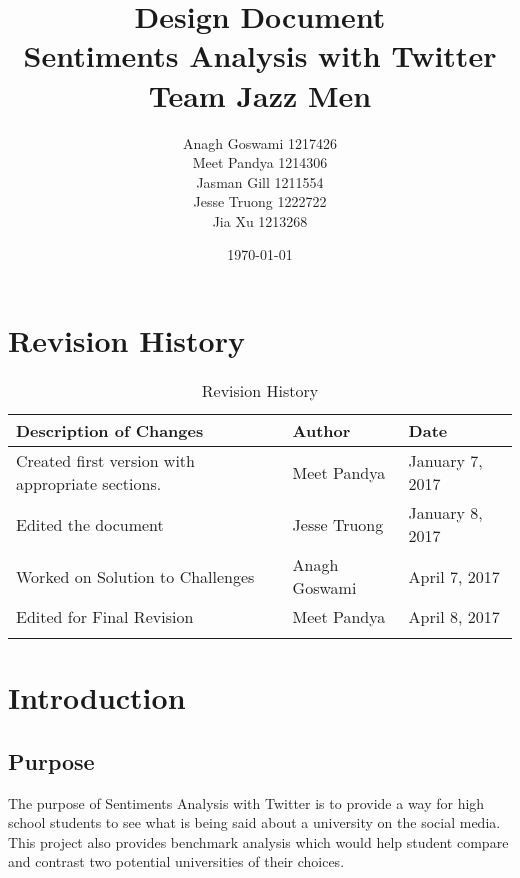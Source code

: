 \documentclass[12pt, titlepage]{article}
\begin{document}
\title{Design Document\\  Sentiments Analysis with Twitter \\Team Jazz Men}
\author{Anagh Goswami 1217426 \\ Meet Pandya 1214306 \\ Jasman Gill  1211554 \\ Jesse Truong  1222722 \\ Jia Xu  1213268 \\}
\date{\today}
\maketitle


\newpage

\tableofcontents
\listoffigures
\listoftables
\newpage
{}
\restoregeometry

\section{Revision History}

\begin{table}[h]
\centering
\caption{Revision History}
\begin{tabular}{|l|l|l|}
\Xhline{3\arrayrulewidth}
\bf Description of Changes & \bf Author & \bf Date\\\hline
Created first version with appropriate sections. & Meet Pandya & January 7, 2017\\\midrule
Edited the document &Jesse Truong & January 8, 2017\\\bottomrule
Worked on Solution to Challenges & Anagh Goswami & April 7, 2017\\\bottomrule
Edited for Final Revision &Meet Pandya & April 8, 2017\\\bottomrule
\Xhline{3\arrayrulewidth}
\end{tabular}
\end{table}

\pagebreak


\section{Introduction}

\subsection{Purpose}
The purpose of Sentiments Analysis with Twitter is to provide a way for high school students to see what is being said about a university on the social media. This project also provides benchmark analysis which would help student compare and contrast two potential universities of their choices.
\end{document}
